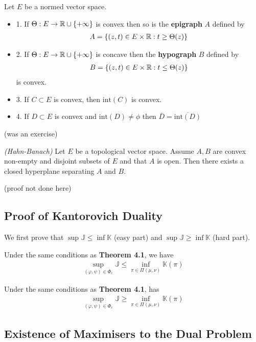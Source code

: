 \documentclass[10pt,a4paper]{article}
\renewenvironment{i}
{\begin{itemize} 
	}%
	{\end{itemize}
}
\begin{document}
 Let $E$ be a normed vector space.
\begin{i}
\item[1.] If $\Theta : E\rightarrow \mathbb{R}\cup \{+ \infty\}$ is convex then so is the \textbf{epigraph} $A$ defined by
\begin{align*}
A = \{(z,t) \in E \times \mathbb{R} : t\geq \Theta (z) \}
\end{align*}
\item[2.] If $\Theta : E\rightarrow \mathbb{R}  \cup \{+ \infty \}$ is concave then the \textbf{hypograph} $B$ defined by
\begin{align*}
B = \{(z,t) \in E\times \mathbb{R} : t\leq \Theta(z) \}
\end{align*}
is convex.
\item[3.] If $C\subset E$ is convex, then $\text{int}(C)$ is convex.
\item[4.] If $D\subset E$ is convex and $\text{int}(D) \neq \phi$ then $\bar{D} = \overline{\text{int}(D)}$
\end{i}
(was an exercise)
\s

 \emph{(Hahn-Banach)} Let $E$ be a topological vector space. Assume $A, B$ are convex non-empty and disjoint subsets of $E$ and that $A$ is open. Then there exists a closed hyperplane separating $A$ and $B$.

(proof not done here)
\s

\subsection{Proof of Kantorovich Duality}

We first prove that  $\sup \mathbb{J} \leq \inf \mathbb{K}$ (easy part) and $\sup \mathbb{J} \geq \inf \mathbb{K}$ (hard part).
\s

 Under the same conditions as \textbf{Theorem 4.1}, we have
\begin{align*}
\sup_{(\varphi, \psi)\in \Phi_c} \mathbb{J} \leq \inf_{\pi \in \Pi(\mu, \nu)} \mathbb{K}(\pi) 
\end{align*}
\s

 Under the same conditions as \textbf{Theorem 4.1}, has
\begin{align*}
\sup_{(\varphi, \psi)\in \Phi_c} \mathbb{J} \geq \inf_{\pi \in \Pi(\mu, \nu)} \mathbb{K}(\pi) 
\end{align*}

\subsection{Existence of Maximisers to the Dual Problem}
\end{document}
